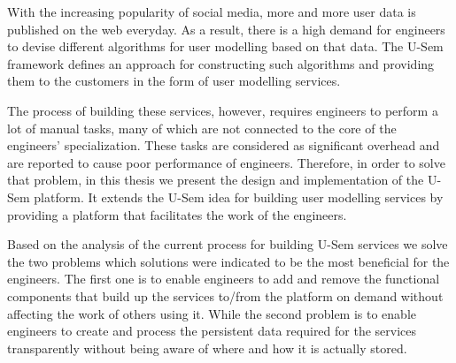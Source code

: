 With the increasing popularity of social media, more and more user data is published on the web everyday. As a result, there is a high demand for engineers to devise different algorithms for user modelling based on that data. The U-Sem framework defines an approach for constructing such algorithms and providing them to the customers in the form of user modelling services.

The process of building these services, however, requires engineers to perform a lot of manual tasks, many of which are not connected to the core of the engineers' specialization. These tasks are considered as significant overhead and are reported to cause poor performance of engineers. Therefore, in order to solve that problem, in this thesis we present the design and implementation of the U-Sem platform. It extends the U-Sem idea for building user modelling services by providing a platform that facilitates the work of the engineers.

Based on the analysis of the current process for building U-Sem services we solve the two problems which solutions were indicated to be the most beneficial for the engineers. The first one is to enable engineers to add and remove the functional components that build up the services to/from the platform on demand without affecting the work of others using it. While the second problem is to enable engineers to create and process the persistent data required for the services transparently without being aware of where and how it is actually stored.